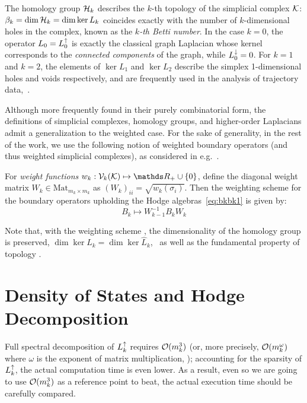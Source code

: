 \documentclass{mynotes}
\begin{document}
The homology group \( \mathcal{H}_k \) describes the \(k\)-th topology of the simplicial complex \( \mathcal{K} \): \( \beta_k = \dim \mathcal{H}_k = \dim \ker L_k \)  coincides exactly with the number of \(k\)-dimensional holes in the complex, known as the \emph{ \(k\)-th Betti number}. In the case \( k = 0 \), the operator \( L_0 = L_{0}^{\uparrow}\) is exactly the classical graph Laplacian whose kernel corresponds to the \textit{connected components} of the graph, while \( L_{0}^{\downarrow}  = 0 \). For \( k = 1 \) and \( k = 2\), the elements of \( \ker L_1 \) and \( \ker L_2\) describe the simplex 1-dimensional holes and voids respectively, and are frequently used in the analysis of trajectory data,~\cite{schaub2019random,benson2016higher}.


Although more frequently found in their purely combinatorial form, the definitions of simplicial complexes, homology groups, and higher-order Laplacians admit a generalization to the weighted case. For the sake of generality, in the rest of the work, we use the following notion of weighted boundary operators (and thus weighted simplicial complexes), as considered in e.g.~\cite{guglielmi2023quantifying}.

\begin{definition}
       For \textit{weight functions} \( w_k : \V k \mapsto \ds R_+ \cup \{ 0 \} \), define the diagonal weight matrix \( W_k \in \mathrm{Mat}_{ m_k \times m_k } \) as  \( (W_k)_{ii} = \sqrt{w_k(\sigma_i)}\). Then the  weighting scheme for the boundary operators upholding the Hodge algebras~\eqref{eq:bkbk1} is given by:
      \begin{equation}
            \label{eq:weighting}
            B_k \mapsto W_{k-1}^{-1} B_k W_k
      \end{equation}
\end{definition}

Note that, with the weighting scheme , the dimensionality of the homology group is preserved, \( \dim \ker L_k = \dim \ker \widehat L_k \),~\cite{guglielmi2023quantifying} as well as the fundamental property of topology . 


\chapter{ Density of States and Hodge Decomposition}


Full spectral decomposition of \( L_{k}^{\uparrow} \) requires \( \mathcal{O} ( m_k^3) \) (or, more precisely, \( \mathcal{O} (m_k^\omega)\) where \( \omega \) is the exponent of matrix multiplication, \cite{banks2023pseudospectral}); accounting for the sparsity of \( L_{k}^{\uparrow} \), the actual computation time is even lower. As a result, even so we are going to use \( \mathcal{O} (m_k^3 )\) as a reference point to beat, the actual execution time should be carefully compared. 
\end{document}
